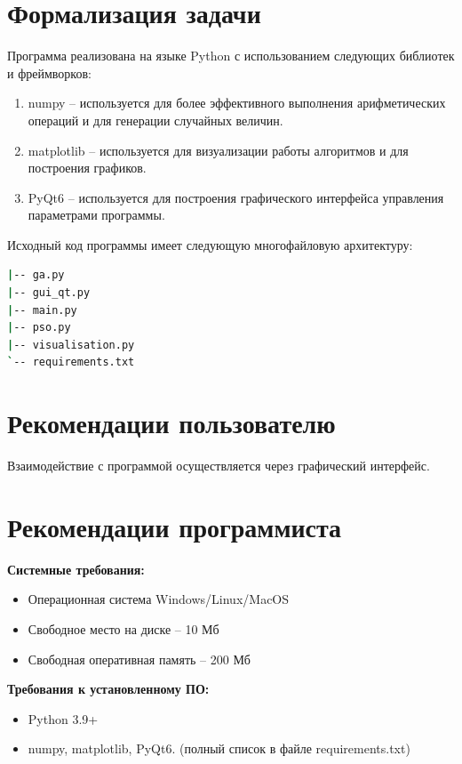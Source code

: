 \documentclass[12pt,a4paper]{article}
\begin{document}
\section{Формализация задачи}
\label{sec:formalization}

Программа реализована на языке Python с использованием следующих библиотек и фреймворков:
\begin{enumerate}
    \item numpy -- используется для более эффективного выполнения арифметических операций и для генерации случайных величин.
    \item matplotlib -- используется для визуализации работы алгоритмов и для построения графиков.
    \item PyQt6 -- используется для построения графического интерфейса управления параметрами программы.
\end{enumerate}

Исходный код программы имеет следующую многофайловую архитектуру:
\begin{lstlisting}[language=bash, caption={Файловая архитектура программы.}, label=lst:filetree]
|-- ga.py
|-- gui_qt.py
|-- main.py
|-- pso.py
|-- visualisation.py
`-- requirements.txt
\end{lstlisting}

\section{Рекомендации пользователю}
\label{sec:user_guide}

Взаимодействие с программой осуществляется через графический интерфейс.

\section{Рекомендации программиста}
\label{sec:dev_guide}

\textbf{Системные требования:}
\begin{itemize}
    \item Операционная система Windows/Linux/MacOS
    \item Свободное место на диске -- 10 Мб
    \item Свободная оперативная память -- 200 Мб
\end{itemize}

\textbf{Требования к установленному ПО:}
\begin{itemize}
    \item Python 3.9+
    \item numpy, matplotlib, PyQt6. (полный список в файле requirements.txt)
\end{itemize}
\end{document}
